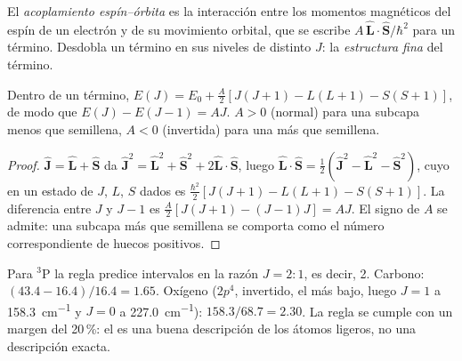 \begin{definition}\label{def:b3:many-electron-atoms:spin-orbit}
El \emph{acoplamiento espín--órbita} es la interacción
entre los momentos magnéticos del espín de un electrón y de su movimiento
orbital, que se escribe $A\,\hat{\mathbf L}\cdot\hat{\mathbf S}/\hbar^2$ para un término.
Desdobla un término en sus niveles de distinto $J$: la \emph{estructura
fina} del término.
\end{definition}

\begin{proposition}\label{prop:b3:many-electron-atoms:lande}
Dentro de un término, $E(J) = E_0 + \frac{A}{2}[J(J+1) - L(L+1) - S(S+1)]$, de modo que
$E(J) - E(J - 1) = AJ$. $A > 0$ (normal) para una subcapa menos que semillena,
$A < 0$ (invertida) para una más que semillena.
\end{proposition}

\begin{proof}
$\hat{\mathbf J} = \hat{\mathbf L} + \hat{\mathbf S}$ da $\hat{\mathbf J}^2 =
\hat{\mathbf L}^2 + \hat{\mathbf S}^2 + 2\hat{\mathbf L}\cdot\hat{\mathbf S}$, luego
$\hat{\mathbf L}\cdot\hat{\mathbf S} = \frac12(\hat{\mathbf J}^2 - \hat{\mathbf L}^2 -
\hat{\mathbf S}^2)$, cuyo  en un estado de $J$, $L$, $S$ dados es
$\frac{\hbar^2}{2}[J(J+1) - L(L+1) - S(S+1)]$. La diferencia entre $J$ y
$J - 1$ es $\frac A2[J(J+1) - (J-1)J] = AJ$. El signo de $A$ se admite: una
subcapa más que semillena se comporta como el número correspondiente de huecos
positivos.
\end{proof}

\begin{example}\label{ex:b3:many-electron-atoms:lande-test}
Para ${}^3$P la regla predice intervalos en la razón $J = 2 : 1$, es decir, 2.
Carbono: $(43.4 - 16.4)/16.4 = 1.65$. Oxígeno ($2p^4$, invertido, 
el más bajo, luego $J = 1$ a \qty{158.3}{cm^{-1}} y $J = 0$ a \qty{227.0}{cm^{-1}}):
$158.3/68.7 = 2.30$. La regla se cumple con un margen del 20\,\%: el 
es una buena descripción de los átomos ligeros, no una descripción exacta.
\end{example}

